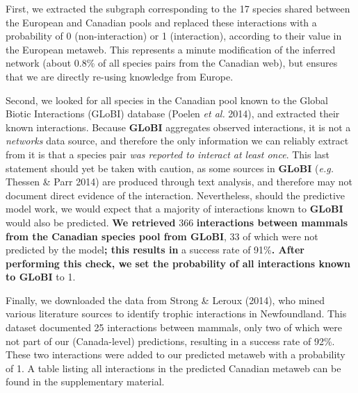 \documentclass[11pt]{article}
\makeatletter
\def\maxwidth{\ifdim\Gin@nat@width>\linewidth\linewidth
\else\Gin@nat@width\fi}
\let\Oldincludegraphics\includegraphics
\renewcommand{\includegraphics}[1]{\Oldincludegraphics[width=\maxwidth]{#1}}
\providecommand{\DIFaddtex}[1]{{\bf #1}} %
\providecommand{\DIFdeltex}[1]{} %
\providecommand{\DIFaddbegin}{\protect\color{blue}} %
\providecommand{\DIFaddend}{\protect\color{black}} %
\providecommand{\DIFdelbegin}{\protect\color{red}} %
\providecommand{\DIFdelend}{\protect\color{black}} %
\providecommand{\DIFadd}[1]{\texorpdfstring{\DIFaddtex{#1}}{#1}} %
\providecommand{\DIFdel}[1]{\texorpdfstring{\DIFdeltex{#1}}{}} %
\newcommand{\DIFscaledelfig}{0.5}
\newlength{\DIFdelgraphicswidth} %
\newlength{\DIFdelgraphicsheight} %
\newcommand{\DIFaddincludegraphics}[2][]{{\color{blue}\fbox{\DIFOincludegraphics[#1]{#2}}}} %
\newcommand{\DIFdelincludegraphics}[2][]{%
\sbox{\DIFdelgraphicsbox}{\DIFOincludegraphics[#1]{#2}}%
\settoboxwidth{\DIFdelgraphicswidth}{\DIFdelgraphicsbox} %
\settoboxtotalheight{\DIFdelgraphicsheight}{\DIFdelgraphicsbox} %
\scalebox{\DIFscaledelfig}{%
\parbox[b]{\DIFdelgraphicswidth}{\usebox{\DIFdelgraphicsbox}\\[-\baselineskip] \rule{\DIFdelgraphicswidth}{0em}}\llap{\resizebox{\DIFdelgraphicswidth}{\DIFdelgraphicsheight}{%
\setlength{\unitlength}{\DIFdelgraphicswidth}%
\begin{picture}(1,1)%
\thicklines\linethickness{2pt} %
{\color[rgb]{1,0,0}\put(0,0){\framebox(1,1){}}}%
{\color[rgb]{1,0,0}\put(0,0){\line( 1,1){1}}}%
{\color[rgb]{1,0,0}\put(0,1){\line(1,-1){1}}}%
\end{picture}%
}\hspace*{3pt}}} %
} %
\DeclareRobustCommand{\DIFaddbegin}{\DIFOaddbegin \let\includegraphics\DIFaddincludegraphics} %
\DeclareRobustCommand{\DIFaddend}{\DIFOaddend \let\includegraphics\DIFOincludegraphics} %
\DeclareRobustCommand{\DIFdelbegin}{\DIFOdelbegin \let\includegraphics\DIFdelincludegraphics} %
\DeclareRobustCommand{\DIFdelend}{\DIFOaddend \let\includegraphics\DIFOincludegraphics} %
\makeatother
\begin{document}
First, we extracted the subgraph corresponding to the 17 species shared
between the European and Canadian pools and replaced these interactions
with a probability of 0 (non-interaction) or 1 (interaction), according
to their value in the European metaweb. This represents a minute
modification of the inferred network (about 0.8\% of all species pairs
from the Canadian web), but ensures that we are directly re-using
knowledge from Europe.

Second, we looked for all species in the Canadian pool known to the
Global Biotic Interactions (GLoBI) database (Poelen \emph{et al.} 2014),
and extracted their known interactions. Because \DIFdelbegin \DIFdel{GLOBI }\DIFdelend \DIFaddbegin \DIFadd{GLoBI }\DIFaddend aggregates
observed interactions, it is not a \emph{networks} data source, and
therefore the only information we can reliably extract from it is that a
species pair \emph{was reported to interact at least once}. This last
statement should yet be taken with caution, as some sources in \DIFdelbegin \DIFdel{GLOBI
}\DIFdelend \DIFaddbegin \DIFadd{GLoBI
}\DIFaddend (\emph{e.g.} Thessen \& Parr 2014) are produced through text analysis,
and therefore may not document direct evidence of the interaction.
Nevertheless, should the predictive model work, we would expect that a
majority of interactions known to \DIFdelbegin \DIFdel{GLOBI }\DIFdelend \DIFaddbegin \DIFadd{GLoBI }\DIFaddend would also be predicted. \DIFdelbegin \DIFdel{After
performing this check, we set the probability of all interactions known
to GLOBI (}\DIFdelend \DIFaddbegin \DIFadd{We
retrieved }\DIFaddend 366 \DIFdelbegin \DIFdel{in total}\DIFdelend \DIFaddbegin \DIFadd{interactions between mammals from the Canadian species
pool from GLoBI}\DIFaddend , 33 of which were not predicted by the model\DIFdelbegin \DIFdel{, for
}\DIFdelend \DIFaddbegin \DIFadd{; this
results in }\DIFaddend a success rate of 91\%\DIFdelbegin \DIFdel{) }\DIFdelend \DIFaddbegin \DIFadd{. After performing this check, we set
the probability of all interactions known to GLoBI }\DIFaddend to 1.

Finally, we downloaded the data from Strong \& Leroux (2014), who mined
various literature sources to identify trophic interactions in
Newfoundland. This dataset documented 25 interactions between mammals,
only two of which were not part of our (Canada-level) predictions,
resulting in a success rate of 92\%. These two interactions were added
to our predicted metaweb with a probability of 1. A table listing all
interactions in the predicted Canadian metaweb can be found in the
supplementary material.
\end{document}
